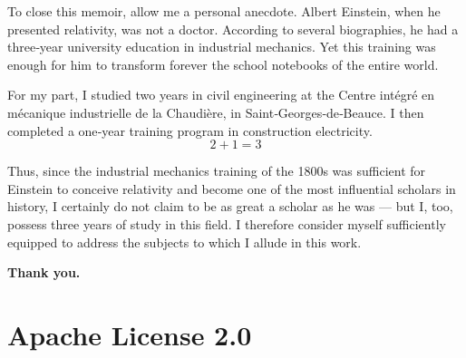 \documentclass[12pt,oneside]{article}
\begin{document}
To close this memoir, allow me a personal anecdote.  
Albert Einstein, when he presented relativity, was not a doctor. According to several biographies, he had a three‑year university education in industrial mechanics. Yet this training was enough for him to transform forever the school notebooks of the entire world.

For my part, I studied two years in civil engineering at the Centre intégré en mécanique industrielle de la Chaudière, in Saint‑Georges‑de‑Beauce. I then completed a one‑year training program in construction electricity.  
\[
2 + 1 = 3
\]

Thus, since the industrial mechanics training of the 1800s was sufficient for Einstein to conceive relativity and become one of the most influential scholars in history, I certainly do not claim to be as great a scholar as he was — but I, too, possess three years of study in this field. I therefore consider myself sufficiently equipped to address the subjects to which I allude in this work.

\bigskip

\begin{center}
\textbf{Thank you.}
\end{center}


\appendix
\section*{Apache License 2.0}
\end{document}
